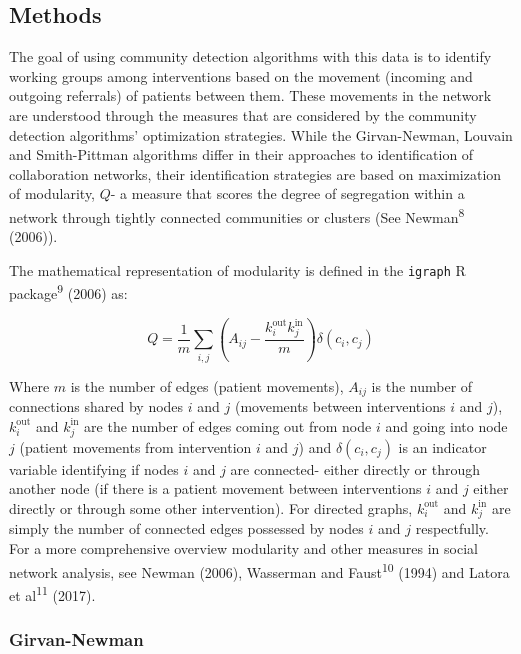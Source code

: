 \subsection{Methods}\label{methods}

The goal of using community detection algorithms with this data is to
identify working groups among interventions based on the movement
(incoming and outgoing referrals) of patients between them. These
movements in the network are understood through the measures that are
considered by the community detection algorithms' optimization
strategies. While the Girvan-Newman, Louvain and Smith-Pittman
algorithms differ in their approaches to identification of collaboration
networks, their identification strategies are based on maximization of
modularity, \(Q\)- a measure that scores the degree of segregation
within a network through tightly connected communities or clusters (See
Newman\textsuperscript{8} (2006)).

The mathematical representation of modularity is defined in the
\texttt{igraph} R package\textsuperscript{9} (2006) as:

\[Q = \frac{1}{m}\sum_{i,j}^{}\left( A_{ij} - \frac{k_{i}^{\text{out}}k_{j}^{\text{in}}}{m} \right)\delta\left( c_{i},c_{j} \right)\]

Where \(m\) is the number of edges (patient movements), \(A_{ij}\) is
the number of connections shared by nodes \(i\) and \(j\) (movements
between interventions \(i\) and \(j\)), \(k_{i}^{\text{out}}\) and
\(k_{j}^{\text{in}}\) are the number of edges coming out from node \(i\)
and going into node \(j\) (patient movements from intervention \(i\) and
\(j\)) and \(\delta\left( c_{i},c_{j} \right)\) is an indicator variable
identifying if nodes \(i\) and \(j\) are connected- either directly or
through another node (if there is a patient movement between
interventions \(i\) and \(j\) either directly or through some other
intervention). For directed graphs, \(k_{i}^{\text{out}}\) and
\(k_{j}^{\text{in}}\) are simply the number of connected edges possessed
by nodes \(i\) and \(j\) respectfully. For a more comprehensive overview
modularity and other measures in social network analysis, see Newman
(2006), Wasserman and Faust\textsuperscript{10} (1994) and Latora et
al\textsuperscript{11} (2017).

\subsubsection{Girvan-Newman}\label{girvan-newman}

